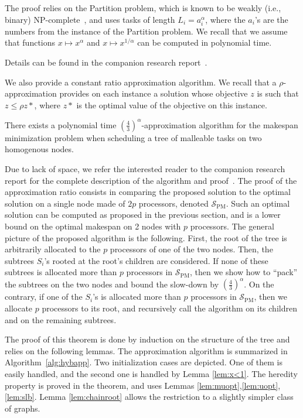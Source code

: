\documentclass{llncs}
\newcommand{\spm}{\ensuremath{\mathcal{S}_{\mathrm{PM}}}\xspace}
\newcommand{\frtrd}{\ensuremath{\left(\frac{4}{3}\right)^\alpha}}
\newif\iflong
\begin{document}
The proof relies on the Partition problem, which is known to be weakly
(i.e., binary) NP-complete~\cite{gareyjohnson}, and uses tasks of
length $L_i=a_i^\alpha$, where the $a_i$'s are the numbers from the
instance of the Partition problem. We recall that we assume that
functions $x\mapsto x^\alpha$ and $x\mapsto x^{1/\alpha}$ can be
computed in polynomial time.  
\iflong
\todo[inline]{faire une courte preuve de
  NP-complétude}
\else
Details can be found in the companion research report~\cite{RR-ipdps-2014}.
\fi

We also provide a constant ratio approximation algorithm. We recall
that a $\rho$-approximation provides on each instance a solution whose
objective $z$ is such that $z \leq \rho z*$, where $z*$ is the optimal
value of the objective on this instance.

\begin{theorem}
\label{th.43approx}
  There exists a polynomial time \frtrd-approximation algorithm for
  the makespan minimization problem when scheduling a tree of malleable tasks on
  two homogenous nodes.
\end{theorem}

\iflong\else Due to lack of space, we refer the interested reader to
the companion research report
for the complete description of the
algorithm and proof~\cite{RR-ipdps-2014}.  The proof of the
approximation ratio consists in comparing the proposed solution to the
optimal solution on a single node made of $2p$ processors, denoted
\spm. Such an optimal solution can be computed as proposed in the
previous section, and is a lower bound on the optimal makespan on 2
nodes with $p$ processors. The general picture of the proposed
algorithm is the following. First, the root of the tree is arbitrarily
allocated to
the $p$ processors of one of the two nodes. Then, the subtrees $S_i$'s
rooted at the root's children are considered. If none of these
subtrees is allocated more than $p$ processors in \spm, then we show
how to ``pack'' the subtrees on the two nodes and bound the slow-down
by \frtrd. On the contrary, if one of the $S_i$'s is allocated more
than $p$ processors in \spm, then we allocate $p$ processors to its
root, and recursively call the algorithm on  its children and on the
remaining subtrees.
\fi

\iflong
The proof of this theorem is done by induction on the structure of the
tree and relies on the following lemmas. The approximation algorithm
is summarized in Algorithm~\ref{alg:hybapp}.  Two initialization cases
are depicted. One of them is easily handled, and the second one is
handled by Lemma \ref{lem:x<1}. The heredity property is proved in the
theorem, and uses Lemmas
\ref{lem:muopt},\ref{lem:uopt},\ref{lem:slb}. Lemma
\ref{lem:chainroot} allows the restriction to a slightly simpler class
of graphs.
\end{document}
